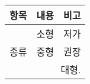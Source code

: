 \documentclass[12pt]{article}
\begin{document}
	
	\begin{tabular}{ c | c | c }
		\hline
		항목 & 내용 & 비고 \\ 
		\hline  
		& 소형 & 저가 \\ \cline{2-3}
		종류 & 중형 & 권장 \\ \cline{2-3}
		& \multicolumn{2}{r}{대형.} \\ \hline
	\end{tabular}
	
\end{document}
